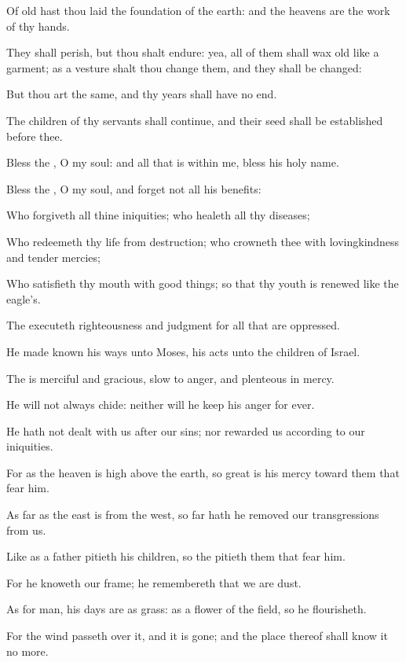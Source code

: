 \Verse Of old hast thou laid the foundation of the earth: and the heavens are the work of thy hands.

\Verse They shall perish, but thou shalt endure: yea, all of them shall wax old like a garment; as a vesture shalt thou change them, and they shall be changed:

\Verse But thou art the same, and thy years shall have no end.

\Verse The children of thy servants shall continue, and their seed shall be established before thee.




\Chapter
\Verse Bless the \LORD, O my soul: and all that is within me, bless his holy name.

\Verse Bless the \LORD, O my soul, and forget not all his benefits:

\Verse Who forgiveth all thine iniquities; who healeth all thy diseases;

\Verse Who redeemeth thy life from destruction; who crowneth thee with lovingkindness and tender mercies;

\Verse Who satisfieth thy mouth with good things; so that thy youth is renewed like the eagle's.

\Verse The \LORD executeth righteousness and judgment for all that are oppressed.

\Verse He made known his ways unto Moses, his acts unto the children of Israel.

\Verse The \LORD is merciful and gracious, slow to anger, and plenteous in mercy.

\Verse He will not always chide: neither will he keep his anger for ever.

\Verse He hath not dealt with us after our sins; nor rewarded us according to our iniquities.

\Verse For as the heaven is high above the earth, so great is his mercy toward them that fear him.

\Verse As far as the east is from the west, so far hath he removed our transgressions from us.

\Verse Like as a father pitieth his children, so the \LORD pitieth them that fear him.

\Verse For he knoweth our frame; he remembereth that we are dust.

\Verse As for man, his days are as grass: as a flower of the field, so he flourisheth.

\Verse For the wind passeth over it, and it is gone; and the place thereof shall know it no more.

